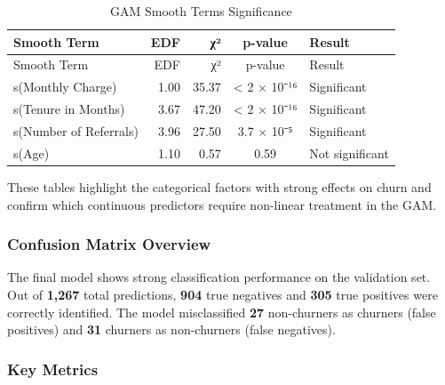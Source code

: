 \documentclass[
]{article}
\begin{document}
\begin{longtable}[]{@{}lrrcl@{}}
\caption{GAM Smooth Terms Significance}\tabularnewline
\toprule\noalign{}
Smooth Term & EDF & χ² & p-value & Result \\
\midrule\noalign{}
\endfirsthead
\toprule\noalign{}
Smooth Term & EDF & χ² & p-value & Result \\
\midrule\noalign{}
\endhead
\bottomrule\noalign{}
\endlastfoot
s(Monthly Charge) & 1.00 & 35.37 & \textless{} 2 × 10⁻¹⁶ &
Significant \\
s(Tenure in Months) & 3.67 & 47.20 & \textless{} 2 × 10⁻¹⁶ &
Significant \\
s(Number of Referrals) & 3.96 & 27.50 & 3.7 × 10⁻⁵ & Significant \\
s(Age) & 1.10 & 0.57 & 0.59 & Not significant \\
\end{longtable}

These tables highlight the categorical factors with strong effects on
churn and confirm which continuous predictors require non-linear
treatment in the GAM.

\hypertarget{confusion-matrix-overview}{%
\subsubsection{Confusion Matrix
Overview}\label{confusion-matrix-overview}}

The final model shows strong classification performance on the
validation set. Out of \textbf{1,267} total predictions, \textbf{904}
true negatives and \textbf{305} true positives were correctly
identified. The model misclassified \textbf{27} non-churners as churners
(false positives) and \textbf{31} churners as non-churners (false
negatives).

\hypertarget{key-metrics-1}{%
\subsubsection{Key Metrics}\label{key-metrics-1}}
\end{document}
